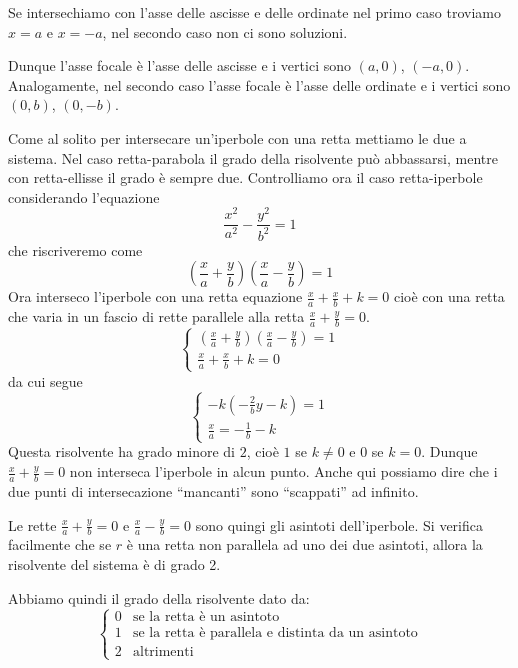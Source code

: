 \documentclass[a4paper]{article}
\begin{document}
Se intersechiamo con l'asse delle ascisse e delle ordinate nel primo caso troviamo
\(x=a\) e \(x=-a\), nel secondo caso non ci sono soluzioni.

Dunque l'asse focale è l'asse delle ascisse e i vertici sono \((a,0)\), \((-a,0)\).
Analogamente, nel secondo caso l'asse focale è l'asse delle ordinate e i vertici sono \((0,b)\), \((0, -b)\).

Come al solito per intersecare un'iperbole con una retta mettiamo le due a sistema.
Nel caso retta-parabola il grado della risolvente può abbassarsi, mentre con retta-ellisse il grado è sempre due.
Controlliamo ora il caso retta-iperbole considerando l'equazione
\[
    \frac{x^2}{a^2} - \frac{y^2}{b^2} = 1
\]
che riscriveremo come
\[
    \left(\frac{x}{a} + \frac{y}{b}\right) \left(\frac{x}{a} - \frac{y}{b}\right) = 1
\]
Ora interseco l'iperbole con una retta equazione \(\frac{x}{a} + \frac{x}{b} + k = 0\)
cioè con una retta che varia in un fascio di rette parallele alla retta \(\frac{x}{a} + \frac{y}{b} = 0\).
\[
    \begin{cases}
        \left(\frac{x}{a} + \frac{y}{b}\right) \left(\frac{x}{a} - \frac{y}{b}\right) = 1 \\
        \frac{x}{a} + \frac{x}{b} + k = 0
    \end{cases}
\]
da cui segue
\[
    \begin{cases}
        -k\left(-\frac{2}{b}y - k\right) = 1 \\
        \frac{x}{a} = - \frac{1}{b} - k
    \end{cases}
\]
Questa risolvente ha grado minore di \(2\), cioè \(1\) se \(k\neq 0\) e \(0\) se \(k=0\).
Dunque \(\frac{x}{a} + \frac{y}{b} = 0\) non interseca l'iperbole in alcun punto.
Anche qui possiamo dire che i due punti di intersecazione ``mancanti'' sono ``scappati'' ad infinito.

Le rette \(\frac{x}{a} + \frac{y}{b} = 0\) e \(\frac{x}{a} - \frac{y}{b} = 0\) sono quingi gli asintoti
dell'iperbole. Si verifica facilmente che se \(r\) è una retta non parallela ad uno dei due asintoti,
allora la risolvente del sistema è di grado 2.

Abbiamo quindi il grado della risolvente dato da:
\[
\begin{cases}
    0 & \text{se la retta è un asintoto} \\
    1 & \text{se la retta è parallela e distinta da un asintoto} \\
    2 & \text{altrimenti}
\end{cases}
\]
\end{document}
